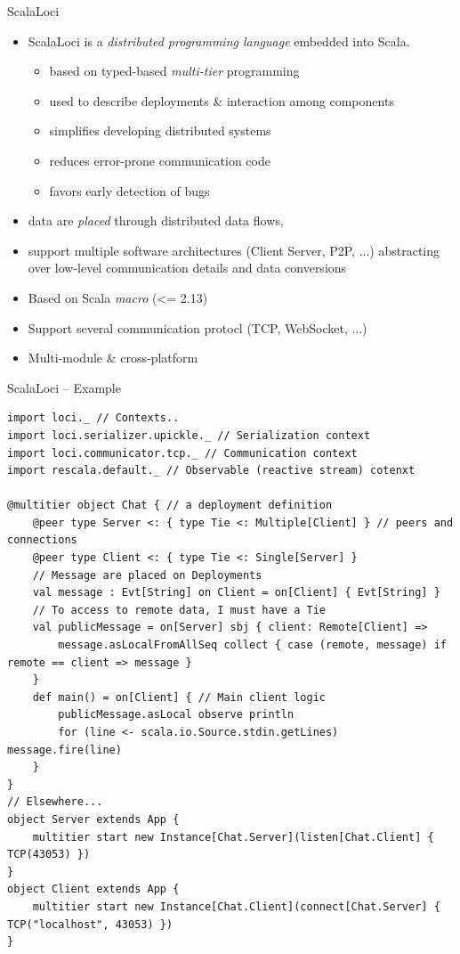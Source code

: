 \documentclass[presentation, 9pt]{beamer}\mode<presentation>{\usetheme{AMSBolognaFC}}
\begin{document}
\begin{frame}{ScalaLoci}
\begin{itemize}
	\item ScalaLoci is a \emph{distributed programming language} embedded into Scala.
 	\begin{itemize}
		\item based on typed-based \emph{multi-tier} programming
  	\item used to describe deployments \& interaction among components
		 \item simplifies developing distributed systems
   	\item reduces error-prone communication code
    \item favors early detection of bugs
	 \end{itemize}
	 \item data are \emph{placed} through distributed data flows, 
	 \item support multiple software architectures (Client Server, P2P, ...) abstracting over low-level communication details and data conversions
	 \item Based on Scala \emph{macro} (<= 2.13)
   \item Support several communication protocl (TCP, WebSocket, ...)
   \item Multi-module \& cross-platform 
\end{itemize}
\end{frame}
\begin{frame}[fragile]{ScalaLoci -- Example}
	\begin{alertblock}{}
		\begin{tcolorbox}[left=0pt, top=0pt, bottom=0pt]
			\begin{verbatim}
import loci._ // Contexts..
import loci.serializer.upickle._ // Serialization context
import loci.communicator.tcp._ // Communication context
import rescala.default._ // Observable (reactive stream) cotenxt

@multitier object Chat { // a deployment definition
	@peer type Server <: { type Tie <: Multiple[Client] } // peers and connections
	@peer type Client <: { type Tie <: Single[Server] }
	// Message are placed on Deployments
	val message : Evt[String] on Client = on[Client] { Evt[String] }
	// To access to remote data, I must have a Tie
	val publicMessage = on[Server] sbj { client: Remote[Client] =>
		message.asLocalFromAllSeq collect { case (remote, message) if remote == client => message }
	}
	def main() = on[Client] { // Main client logic
		publicMessage.asLocal observe println
		for (line <- scala.io.Source.stdin.getLines) message.fire(line)
	}
}
// Elsewhere...
object Server extends App {
	multitier start new Instance[Chat.Server](listen[Chat.Client] { TCP(43053) })
}
object Client extends App {
	multitier start new Instance[Chat.Client](connect[Chat.Server] { TCP("localhost", 43053) })
}
			\end{verbatim}
		\end{tcolorbox}
	\end{alertblock}
\end{frame}
\frame{\titlepage}
\end{document}

